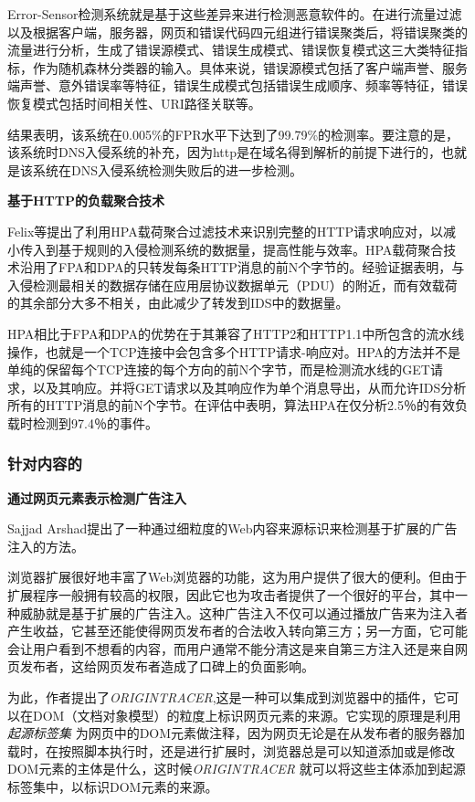 \documentclass[12pt]{article} %
\begin{document}
Error-Sensor检测系统就是基于这些差异来进行检测恶意软件的。在进行流量过滤以及根据客户端，服务器，网页和错误代码四元组进行错误聚类后，将错误聚类的流量进行分析，生成了错误源模式、错误生成模式、错误恢复模式这三大类特征指标，作为随机森林分类器的输入。具体来说，错误源模式包括了客户端声誉、服务端声誉、意外错误率等特征，错误生成模式包括错误生成顺序、频率等特征，错误恢复模式包括时间相关性、URI路径关联等。

结果表明，该系统在0.005\%的FPR水平下达到了99.79\%的检测率。要注意的是，该系统时DNS入侵系统的补充，因为http是在域名得到解析的前提下进行的，也就是该系统在DNS入侵系统检测失败后的进一步检测。

\textbf{基于HTTP的负载聚合技术}

Felix等提出了利用HPA载荷聚合过滤技术来识别完整的HTTP请求响应对，以减小传入到基于规则的入侵检测系统的数据量，提高性能与效率。HPA载荷聚合技术沿用了FPA和DPA的只转发每条HTTP消息的前N个字节的。经验证据表明，与入侵检测最相关的数据存储在应用层协议数据单元（PDU）的附近，而有效载荷的其余部分大多不相关，由此减少了转发到IDS中的数据量。

HPA相比于FPA和DPA的优势在于其兼容了HTTP2和HTTP1.1中所包含的流水线操作，也就是一个TCP连接中会包含多个HTTP请求-响应对。HPA的方法并不是单纯的保留每个TCP连接的每个方向的前N个字节，而是检测流水线的GET请求，以及其响应。并将GET请求以及其响应作为单个消息导出，从而允许IDS分析所有的HTTP消息的前N个字节。在评估中表明，算法HPA在仅分析2.5％的有效负载时检测到97.4％的事件。

\subsubsection{针对内容的}
\label{content}

\textbf{通过网页元素表示检测广告注入}

Sajjad Arshad提出了一种通过细粒度的Web内容来源标识来检测基于扩展的广告注入的方法。

浏览器扩展很好地丰富了Web浏览器的功能，这为用户提供了很大的便利。但由于扩展程序一般拥有较高的权限，因此它也为攻击者提供了一个很好的平台，其中一种威胁就是基于扩展的广告注入。这种广告注入不仅可以通过播放广告来为注入者产生收益，它甚至还能使得网页发布者的合法收入转向第三方；另一方面，它可能会让用户看到不想看的内容，而用户通常不能分清这是来自第三方注入还是来自网页发布者，这给网页发布者造成了口碑上的负面影响。

为此，作者提出了\textit{ORIGINTRACER},这是一种可以集成到浏览器中的插件，它可以在DOM（文档对象模型）的粒度上标识网页元素的来源。它实现的原理是利用 \textit{起源标签集} 为网页中的DOM元素做注释，因为网页无论是在从发布者的服务器加载时，在按照脚本执行时，还是进行扩展时，浏览器总是可以知道添加或是修改DOM元素的主体是什么，这时候\textit{ORIGINTRACER} 就可以将这些主体添加到起源标签集中，以标识DOM元素的来源。
\end{document}
